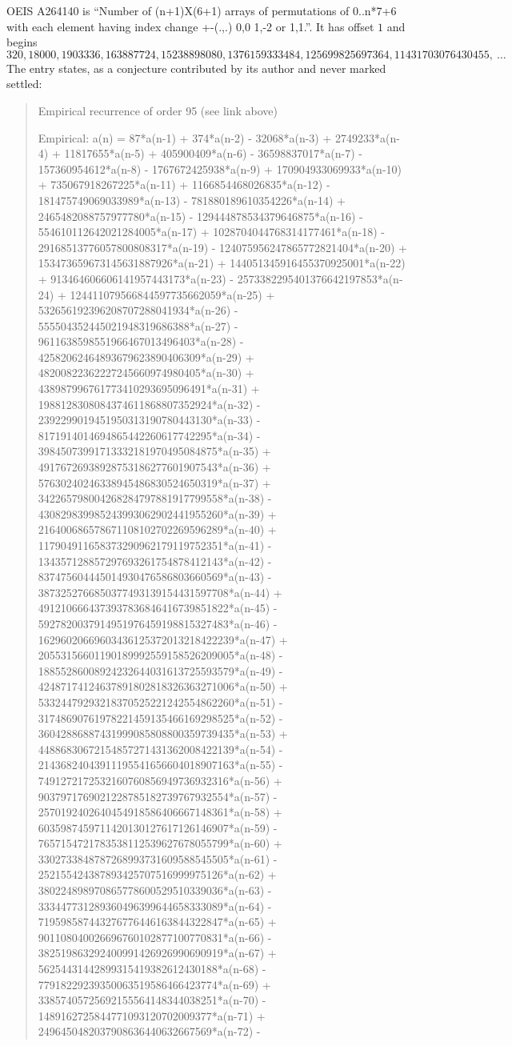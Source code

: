 \documentclass[11pt,a4paper]{article}
\theoremstyle{plain}
\theoremstyle{definition}
\begin{document}
OEIS A264140 is ``Number of (n+1)X(6+1) arrays of permutations of 0..n*7+6 with each element having index change +-(.,.) 0,0 1,-2 or 1,1.''. It has offset $1$ and begins
\[
320, 18000, 1903336, 163887724, 15238898080, 1376159333484, 125699825697364, 11431703076430455,\ \dots
\]
The entry states, as a conjecture contributed by its author and never marked settled:
\begin{quote}
Empirical recurrence of order 95 (see link above)

Empirical: a(n) = 87*a(n-1) + 374*a(n-2) - 32068*a(n-3) + 2749233*a(n-4) + 11817655*a(n-5) + 405900409*a(n-6) - 36598837017*a(n-7) - 157360954612*a(n-8) - 1767672425938*a(n-9) + 170904933069933*a(n-10) + 735067918267225*a(n-11) + 1166854468026835*a(n-12) - 181475749069033989*a(n-13) - 781880189610354226*a(n-14) + 2465482088757977780*a(n-15) - 129444878534379646875*a(n-16) - 554610112642021284005*a(n-17) + 1028704044768314177461*a(n-18) - 29168513776057800808317*a(n-19) - 124075956247865772821404*a(n-20) + 153473659673145631887926*a(n-21) + 144051345916455370925001*a(n-22) + 913464606606141957443173*a(n-23) - 2573382295401376642197853*a(n-24) + 124411079566844597735662059*a(n-25) + 532656192396208707288041934*a(n-26) - 555504352445021948319686388*a(n-27) - 9611638598551966467013496403*a(n-28) - 42582062464893679623890406309*a(n-29) + 48200822362227245660974980405*a(n-30) + 438987996761773410293695096491*a(n-31) + 1988128308084374611868807352924*a(n-32) - 2392299019451950313190780443130*a(n-33) - 8171914014694865442260617742295*a(n-34) - 39845073991713332181970495084875*a(n-35) + 49176726938928753186277601907543*a(n-36) + 57630240246338945486830524650319*a(n-37) + 342265798004268284797881917799558*a(n-38) - 430829839985243993062902441955260*a(n-39) + 216400686578671108102702269596289*a(n-40) + 117904911658373290962179119752351*a(n-41) - 134357128857297693261754878412143*a(n-42) - 837475604445014930476586803660569*a(n-43) - 3873252766850377493139154431597708*a(n-44) + 4912106664373937836846416739851822*a(n-45) - 5927820037914951976459198815327483*a(n-46) - 16296020669603436125372013218422239*a(n-47) + 20553156601190189992559158526209005*a(n-48) - 18855286008924232644031613725593579*a(n-49) - 42487174124637891802818326363271006*a(n-50) + 53324479293218370525221242554862260*a(n-51) - 31748690761978221459135466169298525*a(n-52) - 36042886887431999085808800359739435*a(n-53) + 44886830672154857271431362008422139*a(n-54) - 21436824043911195541656604018907163*a(n-55) - 7491272172532160760856949736932316*a(n-56) + 9037971769021228785182739767932554*a(n-57) - 2570192402640454918586406667148361*a(n-58) + 6035987459711420130127617126146907*a(n-59) - 7657154721783538112539627678055799*a(n-60) + 3302733848787268993731609588545505*a(n-61) - 252155424387893425707516999975126*a(n-62) + 380224898970865778600529510339036*a(n-63) - 333447731289360496399644658333089*a(n-64) - 719598587443276776446163844322847*a(n-65) + 901108040026696760102877100770831*a(n-66) - 382519863292400991426926990690919*a(n-67) + 56254431442899315419382612430188*a(n-68) - 77918229239350063519586466423774*a(n-69) + 33857405725692155564148344038251*a(n-70) - 1489162725844771093120702009377*a(n-71) + 2496450482037908636440632667569*a(n-72) - 
\end{quote}
\end{document}
